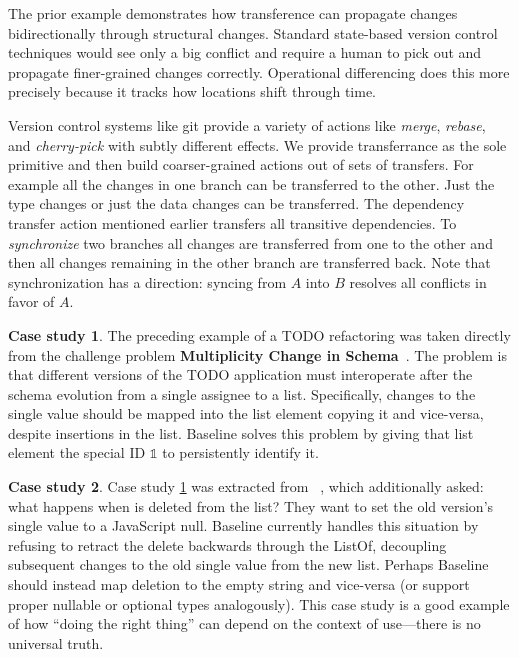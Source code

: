 \documentclass[english,submission]{programming}
\theoremstyle{definition}
\newtheorem{casestudy}{Case study}
\newcommand{\mathbox}[1]{\colorbox{black!10}{$#1$\phantom{i\hspace{-3.5pt}}}}
\newcommand{\quotedstring}[1]{\textsf{\textquotedbl{#1}\textquotedbl}}
\begin{document}
The prior example demonstrates how transference can propagate changes bidirectionally through structural changes. Standard state-based version control techniques would see only a big conflict and require a human to pick out and propagate finer-grained changes correctly.
Operational differencing does this more precisely because it tracks how locations shift through time.

Version control systems like git provide a variety of actions like \textit{merge}, \textit{rebase}, and \textit{cherry-pick} with subtly different effects. We provide transferrance as the sole primitive and then build coarser-grained actions out of sets of transfers. For example all the changes in one branch can be transferred to the other. Just the type changes or just the data changes can be transferred. The dependency transfer action mentioned earlier transfers all transitive dependencies. To \textit{synchronize} two branches all changes are transferred from one to the other and then all changes remaining in the other branch are transferred back. Note that synchronization has a direction: syncing from \mathbox{A} into \mathbox{B} resolves all conflicts in favor of \mathbox{A}.


\begin{casestudy}\label{case-multiplicity}
The preceding example of a TODO refactoring was taken directly from the challenge problem \textbf{Multiplicity Change in Schema}~\cite{challenge-problems}. The problem is that different versions of the TODO application must interoperate after the schema evolution from a single assignee to a list. Specifically, changes to the single value \quotedstring{Jack} should be mapped into the list element copying it and vice-versa, despite insertions in the list. Baseline solves this problem by giving that list element the special ID $\mathbb{1}$ to persistently identify it.
\end{casestudy}


\begin{casestudy}
Case study \ref{case-multiplicity} was extracted from \citeauthor*{Cambria}~\cite[Appendex III]{Cambria}, which additionally asked: what happens when \quotedstring{Jack} is deleted from the list? They want to set the old version's single value to a JavaScript \textsf{null}. Baseline currently handles this situation by refusing to retract the \textsf{delete} backwards through the \textsf{ListOf}, decoupling subsequent changes to the old single value from the new list. Perhaps Baseline should instead map deletion to the empty string and vice-versa (or support proper nullable or optional types analogously). This case study is a good example of how ``doing the right thing'' can depend on the context of use---there is no universal truth.
\end{casestudy}
\end{document}
